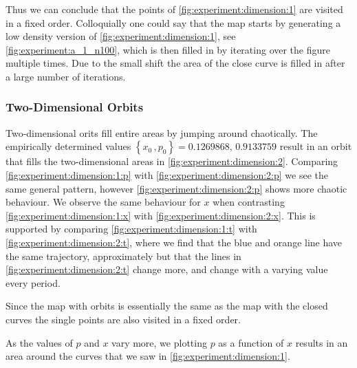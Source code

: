 Thus we can conclude that the points of \cref{fig:experiment:dimension:1} are visited in a fixed order. Colloquially one could say that the map starts by generating a low density version of \cref{fig:experiment:dimension:1}, see \cref{fig:experiment:a_1_n100}, which is then filled in by iterating over the figure multiple times. Due to the small shift the area of the close curve is filled in after a large number of iterations.

\subsubsection{Two-Dimensional Orbits}	
\label{sss:experiment:a:2D}
	Two-dimensional orits fill entire areas by jumping around chaotically. The empirically determined values $\left\{x_0\,, p_0 \right\} = {\num{0.1269868},\,\num{0.9133759}}$ result in an orbit that fills the two-dimensional areas in \cref{fig:experiment:dimension:2}. Comparing \cref{fig:experiment:dimension:1:p} with \cref{fig:experiment:dimension:2:p} we see the same general pattern, however \cref{fig:experiment:dimension:2:p} shows more chaotic behaviour. We observe the same behaviour for $x$ when contrasting \cref{fig:experiment:dimension:1:x} with \cref{fig:experiment:dimension:2:x}. This is supported by comparing \cref{fig:experiment:dimension:1:t} with \cref{fig:experiment:dimension:2:t}, where we find that the blue and orange line have the same trajectory, approximately but that the lines in \cref{fig:experiment:dimension:2:t} change more, and change with a varying value every period.

	Since the map with orbits is essentially the same as the map with the closed curves the single points are also visited in a fixed order. 

	As the values of $p$ and $x$ vary more, we plotting $p$ as a function of $x$ results in an area around the curves that we saw in \cref{fig:experiment:dimension:1}.
